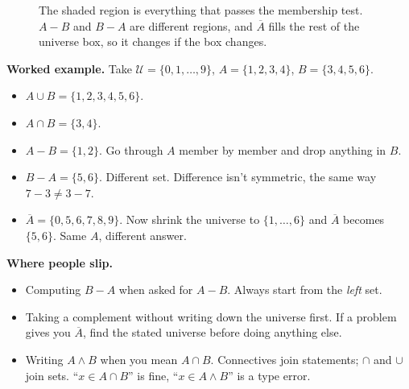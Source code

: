 \begin{figure}[H]
\centering
{}
\caption{The shaded region is everything that passes the membership test. $A-B$ and $B-A$ are different regions, and $\overline{A}$ fills the rest of the universe box, so it changes if the box changes.}
\end{figure}

\textbf{Worked example.} Take $\mathcal{U}=\{0,1,\dots,9\}$, $A=\{1,2,3,4\}$, $B=\{3,4,5,6\}$.
\begin{itemize}
  \item $A\cup B=\{1,2,3,4,5,6\}$.
  \item $A\cap B=\{3,4\}$.
  \item $A-B=\{1,2\}$. Go through $A$ member by member and drop anything in $B$.
  \item $B-A=\{5,6\}$. Different set. Difference isn't symmetric, the same way $7-3\neq3-7$.
  \item $\overline{A}=\{0,5,6,7,8,9\}$. Now shrink the universe to $\{1,\dots,6\}$ and $\overline{A}$ becomes $\{5,6\}$. Same $A$, different answer.
\end{itemize}

\textbf{Where people slip.}
\begin{itemize}
  \item Computing $B-A$ when asked for $A-B$. Always start from the \emph{left} set.
  \item Taking a complement without writing down the universe first. If a problem gives you $\overline{A}$, find the stated universe before doing anything else.
  \item Writing $A\land B$ when you mean $A\cap B$. Connectives join statements; $\cap$ and $\cup$ join sets. ``$x\in A\cap B$'' is fine, ``$x\in A\land B$'' is a type error.
\end{itemize}

